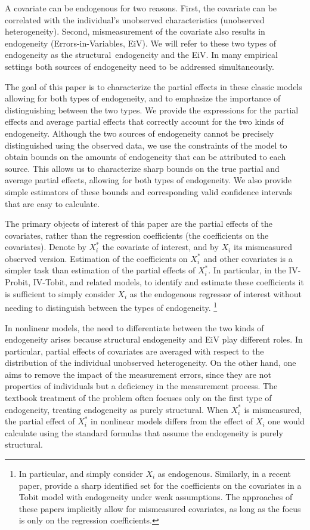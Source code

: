\documentclass[12pt]{article}
\begin{document}
A covariate can be endogenous for two reasons. First, the covariate can be
correlated with the individual's unobserved characteristics (unobserved
heterogeneity). Second, mismeasurement of the covariate also results in
endogeneity (Errors-in-Variables, EiV). We will refer to these two types of
endogeneity as the structural\ endogeneity and the EiV. In many empirical
settings both sources of endogeneity need to be addressed simultaneously.

The goal of this paper is to characterize the partial effects in these
classic models allowing for both types of endogeneity, and to emphasize the
importance of distinguishing between the two types. We provide the
expressions for the partial effects and average partial effects that
correctly account for the two kinds of endogeneity. Although the two sources
of endogeneity cannot be precisely distinguished using the observed data, we
use the constraints of the model to obtain bounds on the amounts of
endogeneity that can be attributed to each source. This allows us to
characterize sharp bounds on the true partial and average partial effects,
allowing for both types of endogeneity. We also provide simple estimators of
these bounds and corresponding valid confidence intervals that are easy to
calculate.

The primary objects of interest of this paper are the partial effects of the
covariates, rather than the regression coefficients (the coefficients on the
covariates). Denote by $X_{i}^{\ast }$ the covariate of interest, and by $%
X_{i}$ its mismeasured observed version. Estimation of the coefficients on $%
X_{i}^{\ast }$ and other covariates is a simpler task than estimation of the
partial effects of $X_{i}^{\ast }$. In particular, in the IV-Probit,
IV-Tobit, and related models, to identify and estimate these coefficients it
is sufficient to simply consider $X_{i}$ as the endogenous regressor of
interest without needing to distinguish between the types of endogeneity.%
\footnote{%
In particular, \cite{SmithBlundell1986Ecta} and \cite{RiversVuong1988JoE}
simply consider $X_{i}$ as endogenous. Similarly, in a recent paper, \cite%
{ChesherKimRosen2023JoE} provide a sharp identified set for the coefficients
on the covariates in a Tobit model with endogeneity under weak assumptions.
The approaches of these papers implicitly allow for mismeasured covariates,
as long as the focus is only on the regression coefficients.} %

In nonlinear models, the need to differentiate between the two kinds of
endogeneity arises because structural endogeneity and EiV play different
roles. In particular, partial effects of covariates are averaged with
respect to the distribution of the individual unobserved heterogeneity. On
the other hand, one aims to remove the impact of the measurement errors,
since they are not properties of individuals but a deficiency in the
measurement process. The textbook treatment of the problem often focuses
only on the first type of endogeneity, treating endogeneity as purely
structural. When $X_{i}^{\ast }$ is mismeasured, the partial effect of $%
X_{i}^{\ast }$ in nonlinear models differs from the effect of $X_{i}$ one
would calculate using the standard formulas that assume the endogeneity is
purely structural.{}
\end{document}
